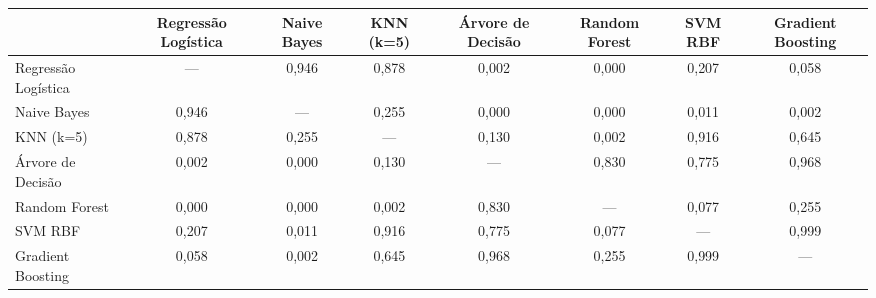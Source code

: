 \begin{tabular}{lccccccc}
\hline
\textbf{} & \textbf{Regressão Logística} & \textbf{Naive Bayes} & \textbf{KNN (k=5)} & \textbf{Árvore de Decisão} & \textbf{Random Forest} & \textbf{SVM RBF} & \textbf{Gradient Boosting} \\
\hline
    Regressão Logística & --- & 0{,}946 & 0{,}878 & 0{,}002 & 0{,}000 & 0{,}207 & 0{,}058 \\
    Naive Bayes & 0{,}946 & --- & 0{,}255 & 0{,}000 & 0{,}000 & 0{,}011 & 0{,}002 \\
    KNN (k=5) & 0{,}878 & 0{,}255 & --- & 0{,}130 & 0{,}002 & 0{,}916 & 0{,}645 \\
    Árvore de Decisão & 0{,}002 & 0{,}000 & 0{,}130 & --- & 0{,}830 & 0{,}775 & 0{,}968 \\
    Random Forest & 0{,}000 & 0{,}000 & 0{,}002 & 0{,}830 & --- & 0{,}077 & 0{,}255 \\
    SVM RBF & 0{,}207 & 0{,}011 & 0{,}916 & 0{,}775 & 0{,}077 & --- & 0{,}999 \\
    Gradient Boosting & 0{,}058 & 0{,}002 & 0{,}645 & 0{,}968 & 0{,}255 & 0{,}999 & --- \\
\hline
\end{tabular}
